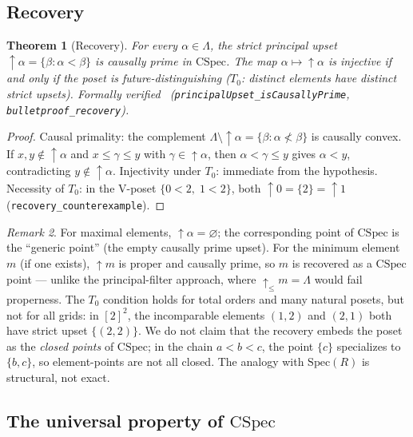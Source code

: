 \documentclass[11pt,a4paper]{article}
\theoremstyle{plain}
\newtheorem{theorem}{Theorem}[section]
\theoremstyle{definition}
\theoremstyle{remark}
\newtheorem{remark}[theorem]{Remark}
\newcommand{\CSpec}{\mathrm{CSpec}}
\newcommand{\Spec}{\mathrm{Spec}}
\begin{document}
\subsection{Recovery}\label{sec:recovery}

\begin{theorem}[Recovery]\label{thm:recovery}
For every $\alpha \in \Lambda$, the strict principal upset
${\uparrow}\alpha = \{\beta : \alpha < \beta\}$ is causally prime
in $\CSpec$. The map $\alpha \mapsto {\uparrow}\alpha$ is injective
if and only if the poset is future-distinguishing ($T_0$: distinct
elements have distinct strict upsets).
Formally verified~\cite{leanrepo}
(\texttt{principalUpset\_isCausallyPrime},
\texttt{bulletproof\_recovery}).
\end{theorem}

\begin{proof}
Causal primality: the complement
$\Lambda \setminus {\uparrow}\alpha = \{\beta : \alpha \not< \beta\}$
is causally convex. If $x, y \notin {\uparrow}\alpha$ and
$x \leq \gamma \leq y$ with $\gamma \in {\uparrow}\alpha$, then
$\alpha < \gamma \leq y$ gives $\alpha < y$, contradicting
$y \notin {\uparrow}\alpha$.
Injectivity under $T_0$: immediate from the hypothesis.
Necessity of $T_0$: in the V-poset $\{0 < 2,\; 1 < 2\}$, both
${\uparrow}0 = \{2\} = {\uparrow}1$
(\texttt{recovery\_counterexample}).
\end{proof}

\begin{remark}
For maximal elements, ${\uparrow}\alpha = \varnothing$; the
corresponding point of $\CSpec$ is the ``generic point''
(the empty causally prime upset). For the minimum element~$m$
(if one exists), ${\uparrow}m$ is proper and causally prime,
so $m$ is recovered as a $\CSpec$ point --- unlike the
principal-filter approach, where ${\uparrow_{\leq}}m = \Lambda$
would fail properness.
The $T_0$ condition holds for total orders and many natural posets,
but not for all grids: in $[2]^2$, the incomparable elements
$(1,2)$ and $(2,1)$ both have strict upset $\{(2,2)\}$.
We do not claim that the recovery embeds the poset as the
\emph{closed points} of $\CSpec$; in the chain $a < b < c$,
the point $\{c\}$ specializes to $\{b,c\}$, so element-points
are not all closed.
The analogy with $\Spec(R)$ is structural, not exact.
\end{remark}


\subsection{The universal property of $\CSpec$}\label{sec:uniqueness}
\end{document}
